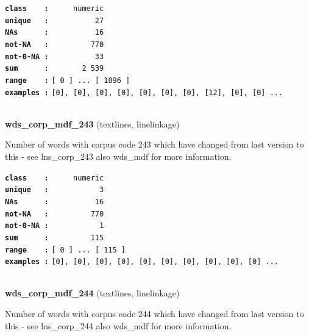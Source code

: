 \documentclass[]{article}
\begin{document}
\textbf{\texttt{class\ \ \ \ :}} \texttt{~~~~~numeric}\\
\textbf{\texttt{unique\ \ \ :}} \texttt{~~~~~~~~~~27}\\
\textbf{\texttt{NAs\ \ \ \ \ \ :}} \texttt{~~~~~~~~~~16}\\
\textbf{\texttt{not-NA\ \ \ :}} \texttt{~~~~~~~~~770}\\
\textbf{\texttt{not-0-NA\ :}} \texttt{~~~~~~~~~~33}\\
\textbf{\texttt{sum\ \ \ \ \ \ :}} \texttt{~~~~~~~2~539}\\
\textbf{\texttt{range\ \ \ \ :}}
\texttt{{[}\ 0\ {]}\ ...\ {[}\ 1096\ {]}}\\
\textbf{\texttt{examples\ :}}
\texttt{{[}0{]},\ {[}0{]},\ {[}0{]},\ {[}0{]},\ {[}0{]},\ {[}0{]},\ {[}0{]},\ {[}12{]},\ {[}0{]},\ {[}0{]}\ ...}\\

~

\textbf{wds\_corp\_mdf\_243} (textlines, linelinkage)

Number of words with corpus code 243 which have changed from last
version to this - see lns\_corp\_243 also wds\_mdf for more information.

\textbf{\texttt{class\ \ \ \ :}} \texttt{~~~~~numeric}\\
\textbf{\texttt{unique\ \ \ :}} \texttt{~~~~~~~~~~~3}\\
\textbf{\texttt{NAs\ \ \ \ \ \ :}} \texttt{~~~~~~~~~~16}\\
\textbf{\texttt{not-NA\ \ \ :}} \texttt{~~~~~~~~~770}\\
\textbf{\texttt{not-0-NA\ :}} \texttt{~~~~~~~~~~~1}\\
\textbf{\texttt{sum\ \ \ \ \ \ :}} \texttt{~~~~~~~~~115}\\
\textbf{\texttt{range\ \ \ \ :}}
\texttt{{[}\ 0\ {]}\ ...\ {[}\ 115\ {]}}\\
\textbf{\texttt{examples\ :}}
\texttt{{[}0{]},\ {[}0{]},\ {[}0{]},\ {[}0{]},\ {[}0{]},\ {[}0{]},\ {[}0{]},\ {[}0{]},\ {[}0{]},\ {[}0{]}\ ...}\\

~

\textbf{wds\_corp\_mdf\_244} (textlines, linelinkage)

Number of words with corpus code 244 which have changed from last
version to this - see lns\_corp\_244 also wds\_mdf for more information.
\end{document}
